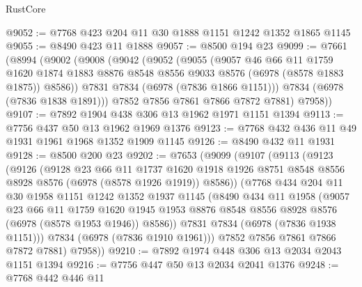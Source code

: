 \begin{lexlean}{RustCore}
\begin{coremodule}
@9052 := @7768 @423 @204 @11 @30 @1888 @1151 @1242 @1352 @1865 @1145
@9055 := @8490 @423 @11 @1888
@9057 := @8500 @194 @23
@9099 := @7661
    (@8994
      (@9002
        (@9008
          (@9042
            (@9052
              (@9055
                (@9057
                  @46
                  @66
                  @11
                  @1759
                  @1620
                  @1874
                  @1883
                  @8876
                  @8548
                  @8556
                  @9033
                  @8576
                  (@6978 (@8578 @1883 @1875))
                  @8586))
              @7831
              @7834
              (@6978 (@7836 @1866 @1151)))
            @7834
            (@6978 (@7836 @1838 @1891)))
          @7852
          @7856
          @7861
          @7866
          @7872
          @7881)
        @7958))
@9107 := @7892 @1904 @438 @306 @13 @1962 @1971 @1151 @1394
@9113 := @7756 @437 @50 @13 @1962 @1969 @1376
@9123 := @7768 @432 @436 @11 @49 @1931 @1961 @1968 @1352 @1909 @1145
@9126 := @8490 @432 @11 @1931
@9128 := @8500 @200 @23
@9202 := @7653
    (@9099
      (@9107
        (@9113
          (@9123
            (@9126
              (@9128
                @23
                @66
                @11
                @1737
                @1620
                @1918
                @1926
                @8751
                @8548
                @8556
                @8928
                @8576
                (@6978 (@8578 @1926 @1919))
                @8586))
            (@7768
              @434
              @204
              @11
              @30
              @1958
              @1151
              @1242
              @1352
              @1937
              @1145
              (@8490
                @434
                @11
                @1958
                (@9057
                  @23
                  @66
                  @11
                  @1759
                  @1620
                  @1945
                  @1953
                  @8876
                  @8548
                  @8556
                  @8928
                  @8576
                  (@6978 (@8578 @1953 @1946))
                  @8586))
              @7831
              @7834
              (@6978 (@7836 @1938 @1151)))
            @7834
            (@6978 (@7836 @1910 @1961)))
          @7852
          @7856
          @7861
          @7866
          @7872
          @7881)
        @7958))
@9210 := @7892 @1974 @448 @306 @13 @2034 @2043 @1151 @1394
@9216 := @7756 @447 @50 @13 @2034 @2041 @1376
@9248 := @7768
    @442
    @446
    @11

\end{coremodule}
\end{lexlean}

